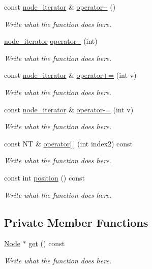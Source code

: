 \begin{DoxyCompactItemize}
const \hyperlink{classnode__iterator}{node\+\_\+iterator} \& \hyperlink{classnode__iterator_a4b1aef270cfa30da675ce20a3c3182e9}{operator-\/-\/} ()
\begin{DoxyCompactList}\small\item\em Write what the function does here. \end{DoxyCompactList}\item 
\hyperlink{classnode__iterator}{node\+\_\+iterator} \hyperlink{classnode__iterator_afc2af6420f945ac4e8f9a761e4ea49a9}{operator-\/-\/} (int)
\begin{DoxyCompactList}\small\item\em Write what the function does here. \end{DoxyCompactList}\item 
const \hyperlink{classnode__iterator}{node\+\_\+iterator} \& \hyperlink{classnode__iterator_a03c4e46aff271f21c51499c53fe26f1f}{operator+=} (int v)
\begin{DoxyCompactList}\small\item\em Write what the function does here. \end{DoxyCompactList}\item 
const \hyperlink{classnode__iterator}{node\+\_\+iterator} \& \hyperlink{classnode__iterator_a2d022eca7a3a4b265fab3f7353965b59}{operator-\/=} (int v)
\begin{DoxyCompactList}\small\item\em Write what the function does here. \end{DoxyCompactList}\item 
const N\+T \& \hyperlink{classnode__iterator_a56ee4f3fd90c7623b933a10408824e4e}{operator\mbox{[}$\,$\mbox{]}} (int index2) const 
\begin{DoxyCompactList}\small\item\em Write what the function does here. \end{DoxyCompactList}\item 
const int \hyperlink{classnode__iterator_a86514b2030e0e2ff9e4ea0e6969aa487}{position} () const 
\begin{DoxyCompactList}\small\item\em Write what the function does here. \end{DoxyCompactList}\end{DoxyCompactItemize}
\subsection*{Private Member Functions}
\begin{DoxyCompactItemize}
\item 
\hyperlink{structNode}{Node} $\ast$ \hyperlink{classnode__iterator_a37fa40399bd9f8b34be8597e5f049466}{get} () const 
\begin{DoxyCompactList}\small\item\em Write what the function does here. \end{DoxyCompactList}\end{DoxyCompactItemize}
